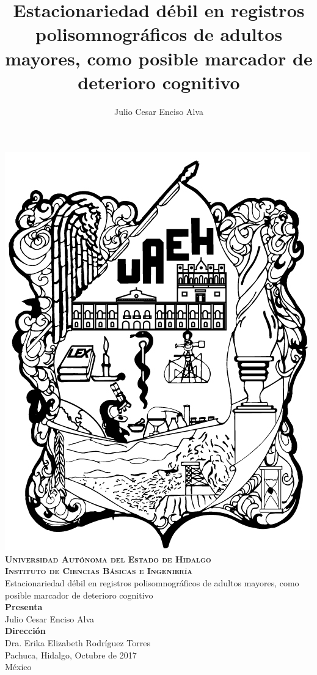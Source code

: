 \documentclass[12pt,letterpaper]{book}
\begin{document}
\setcounter{page}{0}
\thispagestyle{empty}

\title{Estacionariedad débil en registros polisomnográficos de adultos mayores,
como posible marcador de deterioro cognitivo}
\author{Julio Cesar Enciso Alva}

{
\begin{center}
    \includegraphics[width=0.2\linewidth]{./img_oficiales/logo_uaeh.png}\\
    {\Large \textbf{ \textsc{
        Universidad Autónoma del Estado de Hidalgo\\
        Instituto de Ciencias Básicas e Ingeniería\\
        }}
    \vspace*{2.5em}
    }
    {\huge
        Estacionariedad débil en registros polisomnográficos de adultos mayores,
        como posible marcador de deterioro cognitivo\\
    \vspace*{2.5em}
    }
    {\large
        \textbf{Presenta}\\
        \vspace*{.25em}}
        {\Large
        Julio Cesar Enciso Alva\\
        \vspace*{3em}
        }
        {\large
        \textbf{Dirección}\\
        \vspace*{.25em}}
        {\Large
        Dra. Erika Elizabeth Rodríguez Torres\\
    \vspace*{3em}
    }
    {\large
    Pachuca, Hidalgo, Octubre de 2017\\
    M\'exico
    }
\end{center}
}

\newpage

\end{document}

